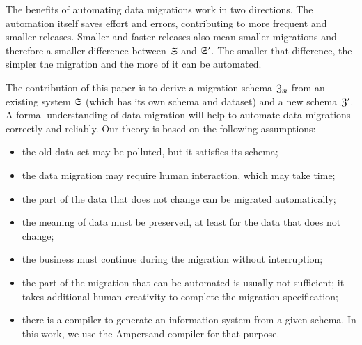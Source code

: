 \documentclass{elsarticle}
\begin{document}
   The benefits of automating data migrations work in two directions.
   The automation itself saves effort and errors,
   contributing to more frequent and smaller releases.
   Smaller and faster releases also mean smaller migrations
   and therefore a smaller difference between $\mathfrak{S}$ and $\mathfrak{S}'$.
   The smaller that difference, the simpler the migration and the more of it can be automated.

   The contribution of this paper is to derive a migration schema $\mathfrak{Z}_m$ from an existing system $\mathfrak{S}$
   (which has its own schema and dataset) and a new schema $\mathfrak{Z}'$.
   A formal understanding of data migration will help to automate data migrations correctly and reliably.
   Our theory is based on the following assumptions:
\begin{itemize}
   \item the old data set may be polluted, but it satisfies its schema;
   \item the data migration may require human interaction, which may take time;
   \item the part of the data that does not change can be migrated automatically;
   \item the meaning of data must be preserved, at least for the data that does not change;
   \item the business must continue during the migration without interruption;
   \item the part of the migration that can be automated is usually not sufficient;
         it takes additional human creativity to complete the migration specification;
   \item there is a compiler to generate an information system from a given schema.
         In this work, we use the Ampersand compiler for that purpose.
\end{itemize}
\end{document}
